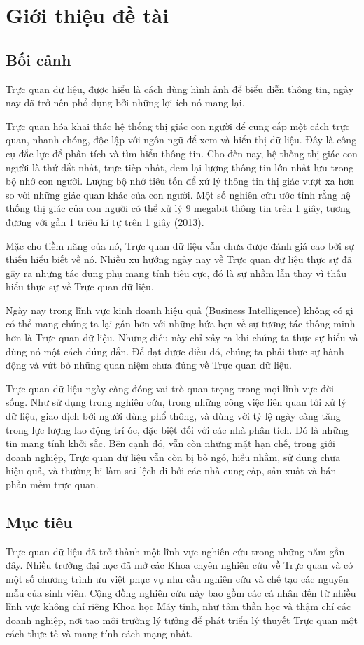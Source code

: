 \documentclass[12pt,a4paper,oneside]{article}
\begin{document}
\tableofcontents
\newpage
\section{Giới thiệu đề tài}
\subsection{Bối cảnh}
Trực quan dữ liệu, được hiểu là cách dùng hình ảnh để biểu diễn thông tin, ngày nay đã trở nên phổ dụng bởi những lợi ích nó mang lại.

Trực quan hóa khai thác hệ thống thị giác con người để cung cấp một cách trực quan, nhanh chóng, độc lập với ngôn ngữ để xem và hiển thị dữ liệu. Đây là công cụ đắc lực để phân tích và tìm hiểu thông tin. Cho đến nay, hệ thống thị giác con người là thứ đắt nhất, trực tiếp nhất, đem lại lượng thông tin lớn nhất lưu trong bộ nhớ con người. Lượng bộ nhớ tiêu tốn để xử lý thông tin thị giác vượt xa hơn so với những giác quan khác của con người. Một số nghiên cứu ước tính rằng hệ thống thị giác của con người có thể xử lý 9 megabit thông tin trên 1 giây, tương đương với gần 1 triệu kí tự trên 1 giây (2013)\cite{bigdata}.

Mặc cho tiềm năng của nó, Trực quan dữ liệu vẫn chưa được đánh giá cao bởi sự thiếu hiểu biết về nó. Nhiều xu hướng ngày nay về Trực quan dữ liệu thực sự đã gây ra những tác dụng phụ mang tính tiêu cực, đó là sự nhầm lẫn thay vì thấu hiểu thực sự về Trực quan dữ liệu. 

Ngày nay trong lĩnh vực kinh doanh hiệu quả (Business Intelligence) không có gì có thể mang chúng ta lại gần hơn với những hứa hẹn về sự tương tác thông minh hơn là Trực quan dữ liệu. Nhưng điều này chỉ xảy ra khi chúng ta thực sự hiểu và dùng nó một cách đúng đắn. Để đạt được điều đó, chúng ta phải thực sự hành động và vứt bỏ những quan niệm chưa đúng về Trực quan dữ liệu.

Trực quan dữ liệu ngày càng đóng vai trò quan trọng trong mọi lĩnh vực đời sống. Như sử dụng trong nghiên cứu, trong những công việc liên quan tới xử lý dữ liệu, giao dịch bởi người dùng phổ thông, và dùng với tỷ lệ ngày càng tăng trong lực lượng lao động trí óc, đặc biệt đối với các nhà phân tích. Đó là những tin mang tính khởi sắc. Bên cạnh đó, vẫn còn những mặt hạn chế, trong giới doanh nghiệp, Trực quan dữ liệu vẫn còn bị bỏ ngỏ, hiểu nhầm, sử dụng chưa hiệu quả, và thường bị làm sai lệch đi bởi các nhà cung cấp, sản xuất và bán phần mềm trực quan. 

\subsection{Mục tiêu}
Trực quan dữ liệu đã trở thành một lĩnh vực nghiên cứu trong những năm gần đây. Nhiều trường đại học đã mở các Khoa chyên nghiên cứu về Trực quan và có một số chương trình ưu việt phục vụ nhu cầu nghiên cứu và chế tạo các nguyên mẫu của sinh viên. Cộng đồng nghiên cứu này bao gồm các cá nhân đến từ nhiều lĩnh vực không chỉ riêng Khoa học Máy tính, như tâm thần học và thậm chí các doanh nghiệp, nơi tạo môi trường lý tưởng để phát triển lý thuyết Trực quan một cách thực tế và mang tính cách mạng nhất.
\end{document}
